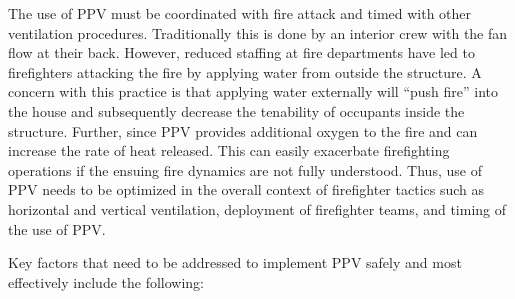 \documentclass{article}
\begin{document}
The use of PPV must be coordinated with fire attack and timed with other ventilation procedures. Traditionally this is done by an interior crew with the fan flow at their back. However, reduced staffing at fire departments have led to firefighters attacking the fire by applying water from outside the structure. A concern with this practice is that applying water externally will “push fire” into the house and subsequently decrease the tenability of occupants inside the structure. Further, since PPV provides additional oxygen to the fire and can increase the rate of heat released. This can easily exacerbate firefighting operations if the ensuing fire dynamics are not fully understood. Thus, use of PPV needs to be optimized in the overall context of firefighter tactics such as horizontal and vertical ventilation, deployment of firefighter teams, and timing of the use of PPV.

Key factors that need to be addressed to implement PPV safely and most effectively include
the following:
\end{document}
